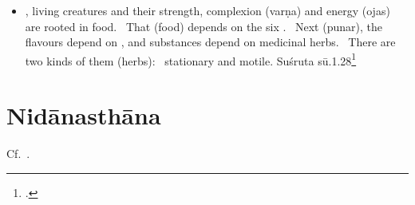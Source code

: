 \documentclass[12pt]{article}
\begin{document}
\begin{itemize}
   
    
    \item [1.28] , living creatures and their strength, complexion (varṇa) 
    and energy (ojas) are rooted in food.  That (food) depends on the six .  
    Next (punar), the flavours depend on , and substances 
    depend on medicinal herbs.  There are two kinds of them (herbs):  stationary and 
    motile. Suśruta sū.1.28\footcites[I, 21]{shar-susr}[7]{susr-trikamji2004}
\end{itemize}

\section{Nidānasthāna}
Cf.\ \cite{adri-engl}.

    \printshorthands

    \printbibliography[notkeyword=edition,notkeyword=shorthand]
    
    \printindex[lexical]
    
\end{document}
